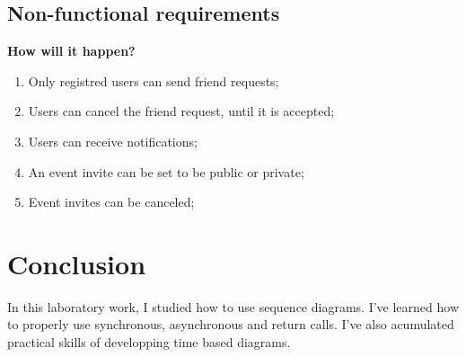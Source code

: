 \documentclass{article}
\begin{document}
		\subsection{Non-functional requirements}
		\textbf{How will it happen?}
		\begin{enumerate}
			\item Only registred users can send friend requests;
			\item Users can cancel the friend request, until it is accepted;
			\item Users can receive notifications;
			\item An event invite can be set to be public or private;
			\item Event invites can be canceled;
		\end{enumerate}

	\section{Conclusion}
		In this laboratory work, I studied how to use sequence diagrams. I've learned how to properly use synchronous, asynchronous and return calls. I've also acumulated practical skills of developping time based diagrams.
\end{document}
